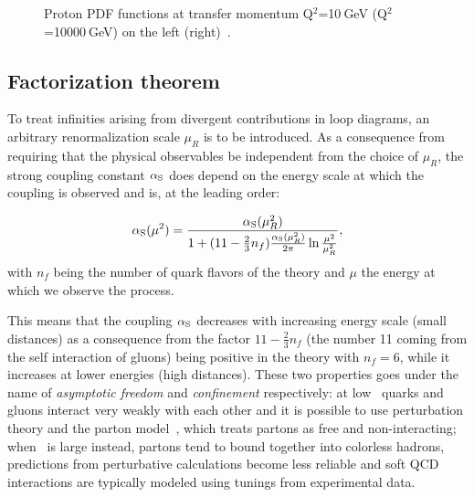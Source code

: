 \begin{figure}[tbph]
\begin{center}
\caption{Proton PDF functions at transfer momentum
 Q$^2$=10$~$GeV (Q$^2$=10000$~$GeV) on the left (right)~\cite{Martin:2009iq}.\label{fig:PDFs}}
\end{center}
\end{figure}



\subsection{Factorization theorem}\label{sec:factorization}

To treat infinities arising from divergent contributions in loop diagrams,
an arbitrary renormalization scale $\mu_R$ is to be introduced. As a consequence
from requiring that the physical observables be independent from the choice of $\mu_R$,
the strong coupling constant $\alphas$ does depend on the energy scale at which the 
coupling is observed and is, at the leading order:

\begin{equation}\label{eq:alphas}
\alphas(\mu^2) = \dfrac{\alphas(\mu_R^2)}{1 + (11 - \frac{2}{3}n_f)\frac{\alphas(\mu_R^2)}{2\pi}\ln\frac{\mu^2}{\mu_R^2} }, 
\end{equation}
with $n_f$ being the number of quark flavors of the theory and $\mu$ the energy at which we observe the process.

This means that the coupling $\alphas$ decreases with increasing energy scale (small distances)
as a consequence from the factor $11 - \frac{2}{3}n_f$ (the number 11 coming from the self interaction of gluons)
being positive in the theory with $n_f = 6$,
while it increases at lower energies (high distances). These two properties goes under the name of
{\it asymptotic freedom} and {\it confinement} respectively: at low \alphas\ quarks and gluons interact very weakly with 
each other and it is possible to use perturbation theory and the parton model~\cite{Feynman:1969ej}, 
which treats partons as free and non-interacting; when \alphas\ is large instead, partons tend to bound together
into colorless hadrons, predictions from perturbative calculations become less reliable and soft QCD interactions
are typically modeled using tunings from experimental data.

